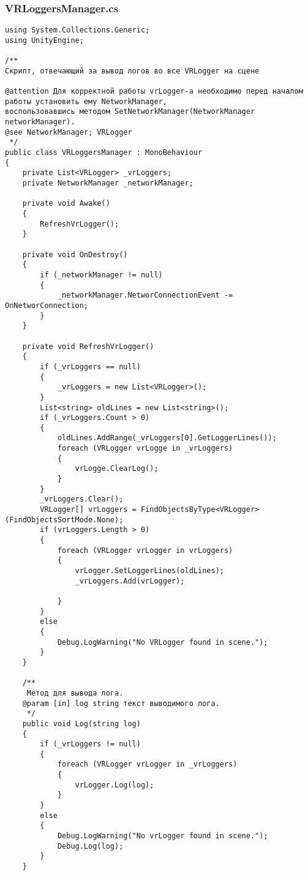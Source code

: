 \subsubsection*{VRLoggersManager.cs}
\begin{verbatim}
﻿using System.Collections.Generic;
using UnityEngine;

/**
Скрипт, отвечающий за вывод логов во все VRLogger на сцене

@attention Для корректной работы vrLogger-а необходимо перед началом работы установить ему NetworkManager, 
воспользовавшись методом SetNetworkManager(NetworkManager networkManager).
@see NetworkManager; VRLogger
 */
public class VRLoggersManager : MonoBehaviour
{
    private List<VRLogger> _vrLoggers;
    private NetworkManager _networkManager;

    private void Awake()
    {
        RefreshVrLogger();
    }

    private void OnDestroy()
    {
        if (_networkManager != null)
        {
            _networkManager.NetworConnectionEvent -= OnNetworConnection;
        }
    }

    private void RefreshVrLogger()
    {
        if (_vrLoggers == null)
        {
            _vrLoggers = new List<VRLogger>();
        }
        List<string> oldLines = new List<string>();
        if (_vrLoggers.Count > 0)
        {
            oldLines.AddRange(_vrLoggers[0].GetLoggerLines());
            foreach (VRLogger vrLogge in _vrLoggers)
            {
                vrLogge.ClearLog();
            }
        }
        _vrLoggers.Clear();
        VRLogger[] vrLoggers = FindObjectsByType<VRLogger>(FindObjectsSortMode.None);
        if (vrLoggers.Length > 0)
        {
            foreach (VRLogger vrLogger in vrLoggers)
            {
                vrLogger.SetLoggerLines(oldLines);
                _vrLoggers.Add(vrLogger);

            }
        }
        else
        {
            Debug.LogWarning("No VRLogger found in scene.");
        }
    }

    /**
     Метод для вывода лога.
    @param [in] log string текст выводимого лога.
     */
    public void Log(string log)
    {
        if (_vrLoggers != null)
        {
            foreach (VRLogger vrLogger in _vrLoggers)
            {
                vrLogger.Log(log);
            }
        }
        else
        {
            Debug.LogWarning("No vrLogger found in scene.");
            Debug.Log(log);
        }
    }


\end{verbatim}
